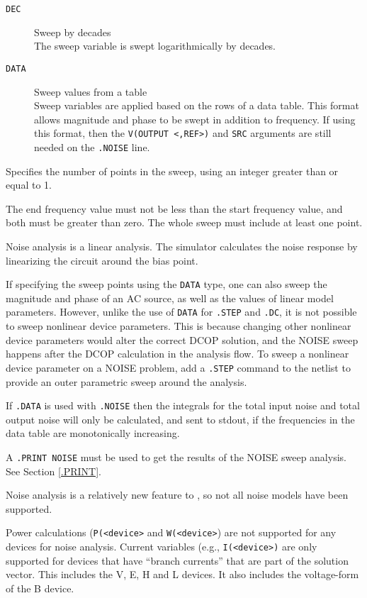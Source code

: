 \begin{Command}
\begin{Arguments}
\begin{description}
\item[\tt DEC] Sweep by decades\\
The sweep variable is swept logarithmically by decades.

\item[\tt DATA] Sweep values from a table\\
Sweep variables are applied based on the rows of a data table.  This format
allows magnitude and phase to be swept in addition to frequency.  If using
this format, then the \texttt{V(OUTPUT <,REF>)} and \texttt{SRC} arguments
are still needed on the \texttt{.NOISE} line.

\end{description}

Specifies the number of points in the sweep, using an integer greater than or equal to 1.


The end frequency value must not be less than the start frequency value,
and both must be greater than zero. The whole sweep must include at
least one point.

\end{Arguments}

\comments

Noise analysis is a linear analysis. The simulator calculates the noise
response by linearizing the circuit around the bias point.

If specifying the sweep points using the \texttt{DATA} type, one can also
sweep the magnitude and phase of an AC source, as well as the values of
linear model parameters.  However, unlike the use of \texttt{DATA} for
\texttt{.STEP} and \texttt{.DC}, it is not possible to sweep nonlinear device
parameters.  This is because changing other nonlinear device parameters would
alter the correct DCOP solution, and the NOISE sweep happens after the DCOP
calculation in the analysis flow.  To sweep a nonlinear device parameter on
a NOISE problem, add a \texttt{.STEP} command to the netlist to provide an
outer parametric sweep around the analysis.

If \texttt{.DATA} is used with \texttt{.NOISE} then the integrals for the total
input noise and total output noise will only be calculated, and sent to stdout,
if the frequencies in the data table are monotonically increasing.

A \texttt{.PRINT NOISE} must be used to get the results of the NOISE sweep
analysis.  See Section \ref{.PRINT}.

Noise analysis is a relatively new feature to \Xyce{}, so not all noise models
have been supported.

Power calculations (\texttt{P(<device>} and \texttt{W(<device>}) are not supported for any
devices for noise analysis.  Current variables (e.g., \texttt{I(<device>)} are only supported
for devices that have ``branch currents'' that are part of the solution vector. This includes
the V, E, H and L devices.  It also includes the voltage-form of the B device.

\end{Command}
